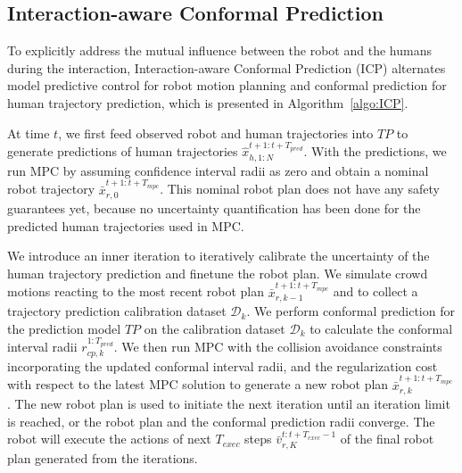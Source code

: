 \subsection{Interaction-aware Conformal Prediction}
To explicitly address the mutual influence between the robot and the humans during the interaction, Interaction-aware Conformal Prediction (ICP) alternates model predictive control for robot motion planning and conformal prediction for human trajectory prediction, which is presented in Algorithm~\ref{algo:ICP}.

At time $t$, we first feed observed robot and human trajectories into $TP$ to generate predictions of human trajectories $\hat{x}_{h, 1:N}^{t+1:t+T_{pred}}$. With the predictions, we run MPC by assuming confidence interval radii as zero and obtain a nominal robot trajectory $\bar{x}_{r, 0}^{t+1:t+T_{mpc}}$. This nominal robot plan does not have any safety guarantees yet, because no uncertainty quantification has been done for the predicted human trajectories used in MPC.

We introduce an inner iteration to iteratively calibrate the uncertainty of the human trajectory prediction and finetune the robot plan. We simulate crowd motions reacting to the most recent robot plan $\bar{x}_{r, {k-1}}^{t+1:t+T_{mpc}}$ and to collect a trajectory prediction calibration dataset $\mathcal{D}_k$. We perform conformal prediction for the prediction model $TP$ on the calibration dataset $\mathcal{D}_k$ to calculate the conformal interval radii $r_{cp, k}^{1:T_{pred}}$. We then run MPC with the collision avoidance constraints incorporating the updated conformal interval radii, and the regularization cost with respect to the latest MPC solution to generate a new robot plan $\bar{x}_{r, {k}}^{t+1:t+T_{mpc}}$. The new robot plan is used to initiate the next iteration until an iteration limit is reached, or the robot plan and the conformal prediction radii converge. The robot will execute the actions of next $T_{exec}$ steps $\bar{v}_{r, K}^{t:t+T_{exec}-1}$ of the final robot plan generated from the iterations.
\vspace{-15pt}

